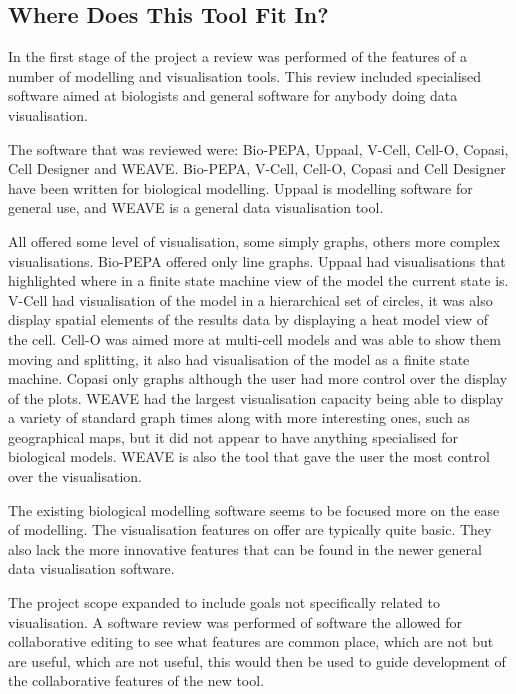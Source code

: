 \subsection{Where Does This Tool Fit In?}

In the first stage of the project a review was performed of the features of a number of modelling and visualisation tools.  This review included specialised software aimed at biologists and general software for anybody doing data visualisation.

The software that was reviewed were: Bio-PEPA, Uppaal, V-Cell, Cell-O, Copasi, Cell Designer and WEAVE.  Bio-PEPA, V-Cell, Cell-O, Copasi and Cell Designer have been written for biological modelling.  Uppaal is modelling software for general use, and WEAVE is a general data visualisation tool.

All offered some level of visualisation, some simply graphs, others more complex visualisations.  Bio-PEPA offered only line graphs.  Uppaal had visualisations that highlighted where in a finite state machine view of the model the current state is.  V-Cell had visualisation of the model in a hierarchical set of circles, it was also display spatial elements of the results data by displaying a heat model view of the cell.  Cell-O was aimed more at multi-cell models and was able to show them moving and splitting, it also had visualisation of the model as a finite state machine.  Copasi only graphs although the user had more control over the display of the plots.  WEAVE had the largest visualisation capacity being able to display a variety of standard graph times along with more interesting ones, such as geographical maps, but it did not appear to have anything specialised for biological models.  WEAVE is also the tool that gave the user the most control over the visualisation.

The existing biological modelling software seems to be focused more on the ease of modelling.  The visualisation features on offer are typically quite basic.  They also lack the more innovative features that can be found in the newer general data visualisation software.

The project scope expanded to include goals not specifically related to visualisation.  A software review was performed of software the allowed for collaborative editing to see what features are common place, which are not but are useful, which are not useful, this would then be used to guide development of the collaborative features of the new tool.


